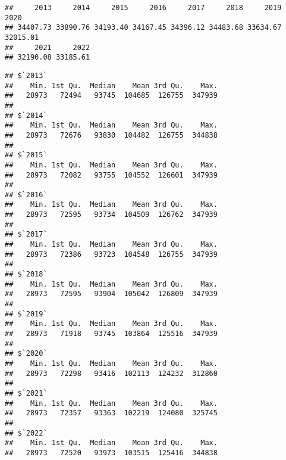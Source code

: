 \documentclass[
]{article}
\newenvironment{Shaded}{\begin{snugshade}}{\end{snugshade}}
\newcommand{\AttributeTok}[1]{\textcolor[rgb]{0.13,0.29,0.53}{#1}}
\newcommand{\ConstantTok}[1]{\textcolor[rgb]{0.56,0.35,0.01}{#1}}
\newcommand{\FunctionTok}[1]{\textcolor[rgb]{0.13,0.29,0.53}{\textbf{#1}}}
\newcommand{\NormalTok}[1]{#1}
\newcommand{\SpecialCharTok}[1]{\textcolor[rgb]{0.81,0.36,0.00}{\textbf{#1}}}
\begin{document}
\begin{Shaded}
\end{Shaded}

\begin{verbatim}
##     2013     2014     2015     2016     2017     2018     2019     2020 
## 34407.73 33890.76 34193.40 34167.45 34396.12 34483.68 33634.67 32015.01 
##     2021     2022 
## 32190.08 33185.61
\end{verbatim}

\begin{Shaded}
\end{Shaded}

\begin{verbatim}
## $`2013`
##    Min. 1st Qu.  Median    Mean 3rd Qu.    Max. 
##   28973   72494   93745  104685  126755  347939 
## 
## $`2014`
##    Min. 1st Qu.  Median    Mean 3rd Qu.    Max. 
##   28973   72676   93830  104482  126755  344838 
## 
## $`2015`
##    Min. 1st Qu.  Median    Mean 3rd Qu.    Max. 
##   28973   72082   93755  104552  126601  347939 
## 
## $`2016`
##    Min. 1st Qu.  Median    Mean 3rd Qu.    Max. 
##   28973   72595   93734  104509  126762  347939 
## 
## $`2017`
##    Min. 1st Qu.  Median    Mean 3rd Qu.    Max. 
##   28973   72386   93723  104548  126755  347939 
## 
## $`2018`
##    Min. 1st Qu.  Median    Mean 3rd Qu.    Max. 
##   28973   72595   93904  105042  126809  347939 
## 
## $`2019`
##    Min. 1st Qu.  Median    Mean 3rd Qu.    Max. 
##   28973   71918   93745  103864  125516  347939 
## 
## $`2020`
##    Min. 1st Qu.  Median    Mean 3rd Qu.    Max. 
##   28973   72298   93416  102113  124232  312860 
## 
## $`2021`
##    Min. 1st Qu.  Median    Mean 3rd Qu.    Max. 
##   28973   72357   93363  102219  124080  325745 
## 
## $`2022`
##    Min. 1st Qu.  Median    Mean 3rd Qu.    Max. 
##   28973   72520   93973  103515  125416  344838
\end{verbatim}
\end{document}
